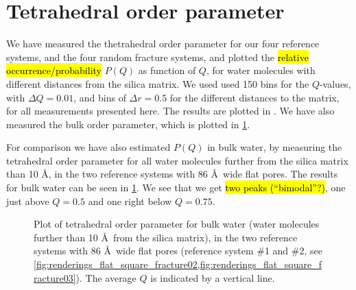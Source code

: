 \section{Tetrahedral order parameter}
%
%

We have measured the thetrahedral order parameter for our four reference systems, and the four random fracture systems, and plotted the \hl{relative occurrence/probability} $P(Q)$ as function of $Q$, for water molecules with different distances from the silica matrix. We used used 150 bins for the $Q$-values, with $\Delta Q = 0.01$, and bins of $\Delta r = 0.5$ for the different distances to the matrix, for all measurements presented here. The results are plotted in . We have also measured the bulk order parameter, which is plotted in \cref{fig:top_bulk}.

For comparison we have also estimated $P(Q)$ in bulk water, by measuring the tetrahedral order parameter for all water molecules further from the silica matrix than 10 \AA, in the two reference systems with 86 \AA\ wide flat pores. The results for bulk water can be seen in \cref{fig:top_bulk}. We see that we get \hl{two peaks (``bimodal''?)}, one just above $Q = 0.5$ and one right below $Q = 0.75$. 
%
\begin{figure}[htpb]%
    \centering%
    \caption{%
        Plot of tetrahedral order parameter for bulk water (water molecules further than 10 \AA\ from the silica matrix), in the two reference systems with 86 \AA\ wide flat pores (reference system \#1 and \#2, see \cref{fig:renderings_flat_square_fracture02,fig:renderings_flat_square_fracture03}). The average $Q$ is indicated by a vertical line. %
    }%
    \label{fig:top_bulk}%
\end{figure}%


